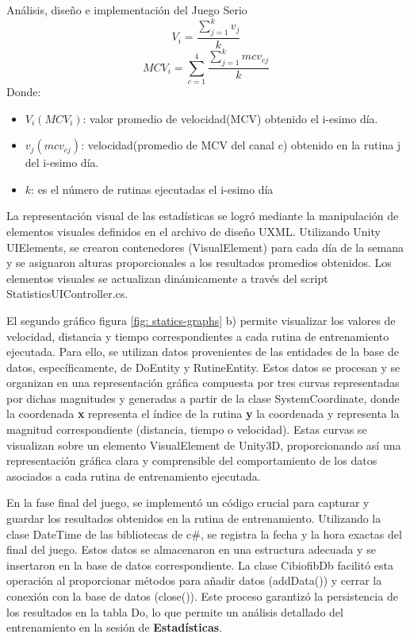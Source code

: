 \begin{thesischapter}{2} {Análisis, diseño e implementación del Juego Serio}
     \begin{equation}
        V_{i} = \frac{\sum_{j=1}^{k} v_{j}}{k}
        \label{eq: 2}
     \end{equation}
     \begin{equation}
        MCV_{i} = \sum_{c=1}^{4}\frac{\sum_{j=1}^{k} mcv_{c j}}{k}
        \label{eq: 3}
    \end{equation}
    Donde:
    \begin{itemize}
        \item $V_{i} (MCV_{i})$: valor promedio de velocidad(MCV) obtenido el i-esimo día.
        \item $v_{j}(mcv_{cj})$: velocidad(promedio de MCV del canal c) obtenido en la rutina j del i-esimo día. 
        \item $k$: es el número de rutinas ejecutadas el i-esimo día 
    \end{itemize}
    La representación visual de las estadísticas se logró mediante la manipulación de elementos visuales definidos en el archivo de diseño UXML. Utilizando Unity 
    UIElements, se crearon contenedores (VisualElement) para cada día de la semana y se asignaron alturas proporcionales a los resultados promedios obtenidos. Los 
    elementos visuales se actualizan dinámicamente a través del script StatisticsUIController.cs.

    El segundo gráfico figura \ref{fig: statics-graphs} b) permite visualizar los valores de velocidad, distancia y tiempo 
    correspondientes a cada rutina de entrenamiento ejecutada. Para ello, se utilizan datos provenientes de las entidades 
    de la base de datos, específicamente, de DoEntity y RutineEntity. Estos datos se procesan y se organizan 
    en una representación gráfica compuesta por tres curvas representadas por dichas magnitudes y generadas a partir de la clase 
    SystemCoordinate, donde la coordenada \textbf{x} representa el índice de la rutina \textbf{y} la coordenada y representa la magnitud correspondiente (distancia, tiempo o velocidad). Estas curvas 
    se visualizan sobre un elemento VisualElement de Unity3D, proporcionando así una representación gráfica clara y comprensible del 
    comportamiento de los datos asociados a cada rutina de entrenamiento ejecutada.
    

    En la fase final del juego, se implementó un código crucial para capturar y guardar los resultados obtenidos en la rutina de entrenamiento. Utilizando la clase DateTime de las bibliotecas de c\#, 
    se registra la fecha y la hora exactas del final del juego. Estos datos se almacenaron en una estructura adecuada y se insertaron en la base de datos correspondiente. La clase CibiofibDb facilitó esta 
    operación al proporcionar métodos para añadir datos (addData()) y cerrar la conexión con la base de datos (close()). Este proceso garantizó la persistencia de los resultados en la tabla Do, lo que 
    permite un análisis detallado del entrenamiento en la sesión de \textbf{Estadísticas}.



\end{thesischapter}
